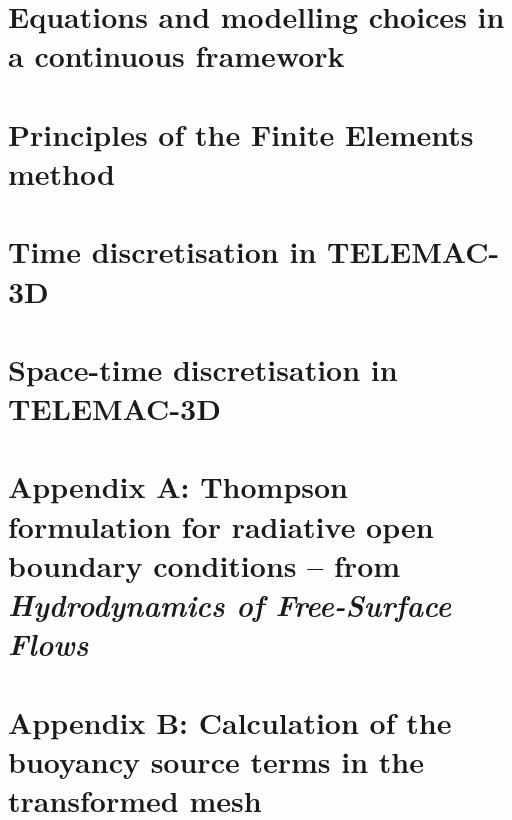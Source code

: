 \documentclass[Telemac3D]{../../data/TelemacDoc} %
\begin{document}

\printnomenclature

\chapter{Equations and modelling choices in a continuous framework}\label{Chapter1}

\newpage

\chapter{Principles of the Finite Elements method}\label{Chapter2}

\newpage

\chapter{Time discretisation in TELEMAC-3D}\label{Chapter3}

\newpage

\chapter{Space-time discretisation in TELEMAC-3D}\label{Chapter4}

\newpage

\chapter{Appendix A: Thompson formulation for radiative open boundary conditions -- from \textit{Hydrodynamics of Free-Surface Flows}}\label{appendixA}

\newpage

\chapter{Appendix B: Calculation of the buoyancy source terms in the transformed mesh}\label{appendixB}

\newpage

%
%
%
\end{document}
